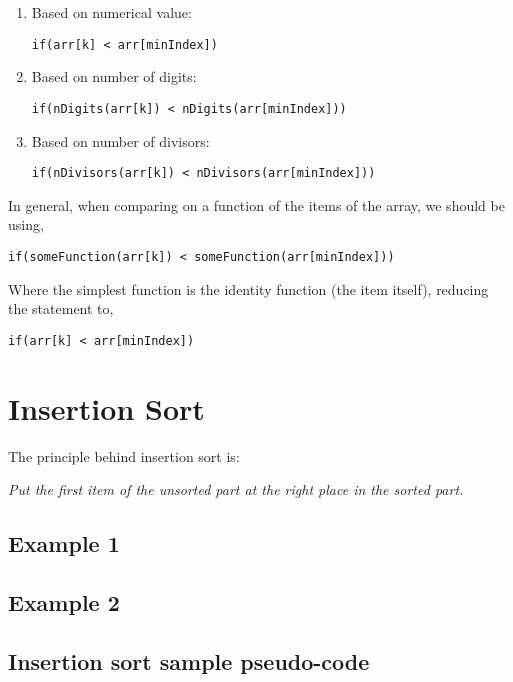 \begin{enumerate}
\item Based on numerical value: 
\begin{lstlisting}
if(arr[k] < arr[minIndex])
\end{lstlisting}
\item Based on number of digits: 
\begin{lstlisting}
if(nDigits(arr[k]) < nDigits(arr[minIndex]))
\end{lstlisting}
\item Based on number of divisors:
\begin{lstlisting}
if(nDivisors(arr[k]) < nDivisors(arr[minIndex]))
\end{lstlisting}
\end{enumerate}

In general, when comparing on a function of the items of the array, we should be using,

\begin{lstlisting}
if(someFunction(arr[k]) < someFunction(arr[minIndex]))
\end{lstlisting}

Where the simplest function is the identity function (the item itself), reducing the statement to,

\begin{lstlisting}
if(arr[k] < arr[minIndex])
\end{lstlisting}

\section{Insertion Sort}

The principle behind insertion sort is:

\begin{center}
	\emph{
		Put the first item of the unsorted part at the right place in the sorted part.
	}
\end{center}

\subsection*{Example 1}


\subsection*{Example 2}



\subsection{Insertion sort sample pseudo-code}


